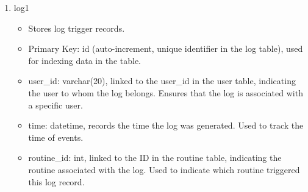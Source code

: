 \begin{enumerate}
\begin{enumerate}
              \item log1
                    \begin{itemize}
                        \item Stores log trigger records.
                        \item Primary Key: id (auto-increment, unique identifier in the log table), used for indexing data in the table.
                        \item user\_id: varchar(20), linked to the user\_id in the user table, indicating the user to whom the log belongs. Ensures that the log is associated with a specific user.
                        \item time: datetime, records the time the log was generated. Used to track the time of events.
                        \item routine\_id: int, linked to the ID in the routine table, indicating the routine associated with the log. Used to indicate which routine triggered this log record.\\
                    \end{itemize}


\end{enumerate}
\end{enumerate}
